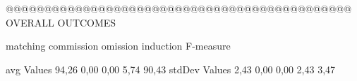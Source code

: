 @@@@@@@@@@@@@@@@@@@@@@@@@@@@@@@@@@@@@@@@@@@@@ OVERALL OUTCOMES

               matching commission   omission  induction  F-measure
               
avg Values      94,26       0,00       0,00       5,74     90,43        
stdDev Values    2,43       0,00       0,00       2,43      3,47        